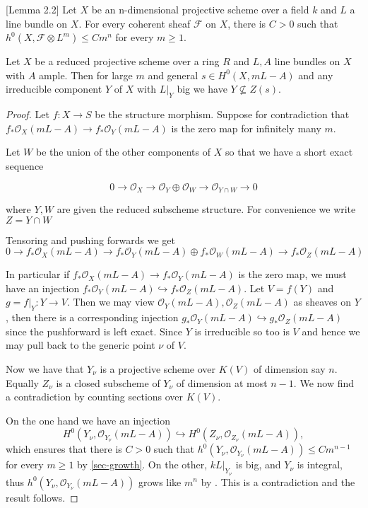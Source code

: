 \documentclass[a4paper,12pt]{book}
\newcommand{\F}{\mathcal{F}}
\newcommand{\ox}[1][X]{\mathcal{O}_{#1}}
\begin{document}
\begin{lemma}\cite{cascini2014augmented}[Lemma 2.2]\label{sec-growth}
	Let $X$ be an n-dimensional projective scheme over a field $k$ and $L$ a line bundle on $X$.
	For every coherent sheaf $\F$ on $X$, there is $C > 0$ such that $h^{0}(X, \F\otimes L^{m}) \leq C m^{n}$ for every $m \geq 1$.
\end{lemma}

\begin{lemma}\label{bigsecs}
	Let $X$ be a reduced projective scheme over a ring $R$ and $L,A$ line bundles on $X$ with $A$ ample. Then for large $m$ and general $s \in H^{0}(X,mL-A)$ and any irreducible component $Y$ of $X$ with $L|_{Y}$ big we have $Y \not \subseteq Z(s)$.
\end{lemma}

\begin{proof}
	
	Let $f:X \to S$ be the structure morphism. Suppose for contradiction that $f_{*}\ox(mL-A) \to f_{*}\ox[Y](mL-A)$ is the zero map for infinitely many $m$.
	
	Let $W$ be the union of the other components of $X$ so that we have a short exact sequence 
	
	\[0 \to \ox \to \ox[Y]\oplus \ox[W] \to \ox[Y\cap W] \to 0\]
	
	where $Y,W$ are given the reduced subscheme structure. For convenience we write $Z=Y\cap W$
	
	Tensoring and pushing forwards we get 
	\[0 \to f_{*}\ox(mL-A)\to f_{*}\ox[Y](mL-A)\oplus f_{*}\ox[W](mL-A) \to f_{*}\ox[Z](mL-A) \]
	
	In particular if $f_{*}\ox(mL-A) \to f_{*}\ox[Y](mL-A)$ is the zero map, we must have an injection $ f_{*}\ox[Y](mL-A) \hookrightarrow f_{*}\ox[Z](mL-A)$. Let $V=f(Y)$ and $g=f|_{Y}:Y \to V$. Then we may view $\ox[Y](mL-A), \ox[Z](mL-A)$ as sheaves on $Y$, then there is a corresponding injection $g_{*}\ox[Y](mL-A) \hookrightarrow g_{*}\ox[Z](mL-A)$ since the pushforward is left exact. Since $Y$ is irreducible so too is $V$ and hence we may pull back to the generic point $\nu$ of $V$.
	
	Now we have that $Y_{\nu}$ is a projective scheme over $K(V)$ of dimension say $n$. Equally $Z_{\nu}$ is a closed subscheme of $Y_{\nu}$ of dimension at most $n-1$. We now find a contradiction by counting sections over $K(V)$.
	
	On the one hand we have an injection $$H^{0}(Y_{\nu},\ox[Y_{\nu}](mL-A)) \hookrightarrow H^{0}(Z_{\nu}, \ox[Z_{\nu}](mL-A)),$$ which ensures that there is $C > 0$ such that $h^{0}(Y_{\nu}, \ox[Y_{\nu}](mL-A)) \leq C m^{n-1}$ for every $m \geq 1$ by \autoref{sec-growth}. On the other, $kL|_{Y_{\nu}}$ is big, and $Y_{\nu}$ is integral, thus $h^{0}(Y_{\nu}, \ox[Y_{\nu}](mL-A))$ grows like $m^{n}$ by \cite[Lemma 4.2]{birkar2017augmented}. This is a contradiction and the result follows.		
\end{proof}
\end{document}
